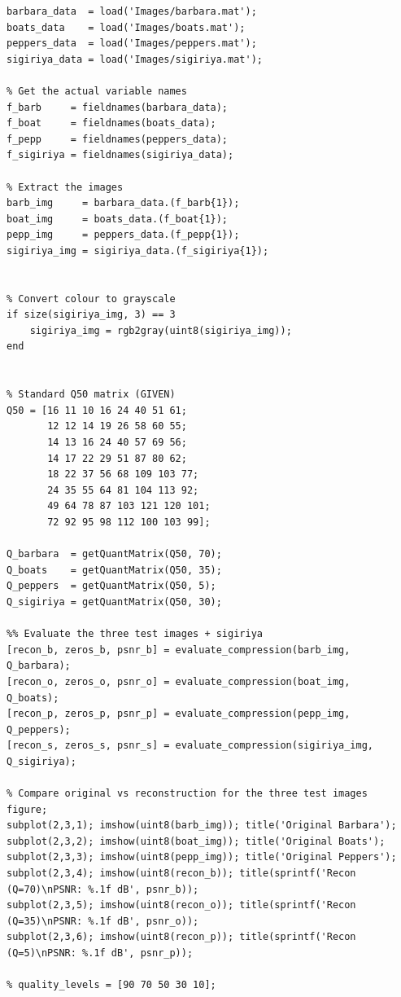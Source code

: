 \documentclass[12pt]{article}
\begin{document}
\begin{lstlisting}[style=mymatlab, caption={Sample MATLAB script for 2D-DCT image compression}, label={lst:dct-compression}]
%% Load the data
barbara_data  = load('Images/barbara.mat');
boats_data    = load('Images/boats.mat');
peppers_data  = load('Images/peppers.mat');
sigiriya_data = load('Images/sigiriya.mat');

% Get the actual variable names
f_barb     = fieldnames(barbara_data);
f_boat     = fieldnames(boats_data);
f_pepp     = fieldnames(peppers_data);
f_sigiriya = fieldnames(sigiriya_data);

% Extract the images
barb_img     = barbara_data.(f_barb{1});
boat_img     = boats_data.(f_boat{1});
pepp_img     = peppers_data.(f_pepp{1});
sigiriya_img = sigiriya_data.(f_sigiriya{1});


% Convert colour to grayscale
if size(sigiriya_img, 3) == 3
    sigiriya_img = rgb2gray(uint8(sigiriya_img));
end


% Standard Q50 matrix (GIVEN)
Q50 = [16 11 10 16 24 40 51 61;
       12 12 14 19 26 58 60 55;
       14 13 16 24 40 57 69 56;
       14 17 22 29 51 87 80 62;
       18 22 37 56 68 109 103 77;
       24 35 55 64 81 104 113 92;
       49 64 78 87 103 121 120 101;
       72 92 95 98 112 100 103 99];

Q_barbara  = getQuantMatrix(Q50, 70);
Q_boats    = getQuantMatrix(Q50, 35);
Q_peppers  = getQuantMatrix(Q50, 5);
Q_sigiriya = getQuantMatrix(Q50, 30);

%% Evaluate the three test images + sigiriya
[recon_b, zeros_b, psnr_b] = evaluate_compression(barb_img,     Q_barbara);
[recon_o, zeros_o, psnr_o] = evaluate_compression(boat_img,     Q_boats);
[recon_p, zeros_p, psnr_p] = evaluate_compression(pepp_img,     Q_peppers);
[recon_s, zeros_s, psnr_s] = evaluate_compression(sigiriya_img, Q_sigiriya);

% Compare original vs reconstruction for the three test images
figure;
subplot(2,3,1); imshow(uint8(barb_img)); title('Original Barbara');
subplot(2,3,2); imshow(uint8(boat_img)); title('Original Boats');
subplot(2,3,3); imshow(uint8(pepp_img)); title('Original Peppers');
subplot(2,3,4); imshow(uint8(recon_b)); title(sprintf('Recon (Q=70)\nPSNR: %.1f dB', psnr_b));
subplot(2,3,5); imshow(uint8(recon_o)); title(sprintf('Recon (Q=35)\nPSNR: %.1f dB', psnr_o));
subplot(2,3,6); imshow(uint8(recon_p)); title(sprintf('Recon (Q=5)\nPSNR: %.1f dB', psnr_p));

% quality_levels = [90 70 50 30 10];


\end{lstlisting}
\end{document}
